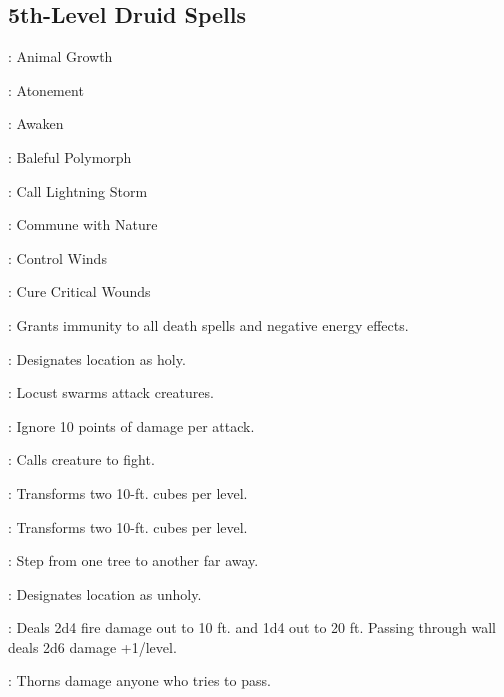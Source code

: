 \begin{multicols}{2}
\subsection{5th-Level Druid Spells}
\begin{description*}
\item[\linkspell{Animal Growth}:] Animal Growth
\item[\linkspell{Atonement}:] Atonement
\item[\linkspell{Awaken}:] Awaken
\item[\linkspell{Baleful Polymorph}:] Baleful Polymorph
\item[\linkspell{Call Lightning Storm}:] Call Lightning Storm
\item[\linkspell{Commune with Nature}:] Commune with Nature
\item[\linkspell{Control Winds}:] Control Winds
\item[\linkspell{Cure Critical Wounds}:] Cure Critical Wounds
\item[\linkspell{Death Ward}:] Grants immunity to all death spells and negative energy effects.
\item[\linkspell{Hallow}:] Designates location as holy.
\item[\linkspell{Insect Plague}:] Locust swarms attack creatures.
\item[\linkspell{Stoneskin}:] Ignore 10 points of damage per attack.
\item[\linkspell{Summon Nature’s Ally V}:] Calls creature to fight.
\item[\linkspell{Transmute Mud to Rock}:] Transforms two 10-ft. cubes per level.
\item[\linkspell{Transmute Rock to Mud}:] Transforms two 10-ft. cubes per level.
\item[\linkspell{Tree Stride}:] Step from one tree to another far away.
\item[\linkspell{Unhallow}:] Designates location as unholy.
\item[\linkspell{Wall of Fire}:] Deals 2d4 fire damage out to 10 ft. and 1d4 out to 20 ft. Passing through wall deals 2d6 damage +1/level.
\item[\linkspell{Wall of Thorns}:] Thorns damage anyone who tries to pass.
\end{description*}


\end{multicols}
